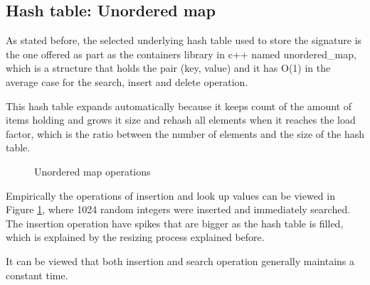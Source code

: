 \documentclass[a4paper,12pt]{article}
\begin{document}
\subsection{Hash table: Unordered map} \label{hashTable}
As stated before, the selected underlying hash table used to store the signature is the one offered as part as the containers library in c++ named unordered\_map, which is a structure that holds the pair (key, value) and it has O(1) in the average case for the search, insert and delete operation.

This hash table expands automatically because it keeps count of the amount of items holding and grows it size and rehash all elements when it reaches the load factor, which is the ratio between the number of elements and the size of the hash table. 

\begin{figure}[H]
\centering
{}%
\hfill %
%
\caption{Unordered map operations}
\label{fig:hashTableFig}
\end{figure}

Empirically the operations of insertion and look up values can be viewed in Figure \ref{fig:hashTableFig}, where 1024 random integers were inserted and immediately searched. The insertion operation have spikes that are bigger as the hash table is filled, which is explained by the resizing process explained before. 

It can be viewed that both insertion and search operation generally maintains a constant time. \\
\end{document}
